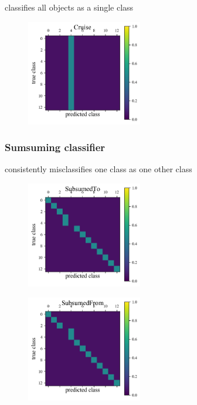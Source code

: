 classifies all objects as a single class

\begin{figure}
	\begin{center}
		\includegraphics[width=0.45\textwidth]{./fig/Cruise.png}\\
		\caption{}
		\label{fig:cruise_data}
	\end{center}
\end{figure}

\subsubsection{Sumsuming classifier}
\label{sec:subsume_data}

consistently misclassifies one class as one other class

\begin{figure}
	\begin{center}
		\includegraphics[width=0.45\textwidth]{./fig/SubsumedTo.png}\\
		\caption{}
		\label{fig:subsumer_data}
	\end{center}
\end{figure}

\begin{figure}
	\begin{center}
		\includegraphics[width=0.45\textwidth]{./fig/SubsumedFrom.png}\\
		\caption{}
		\label{fig:subsumee_data}
	\end{center}
\end{figure}

